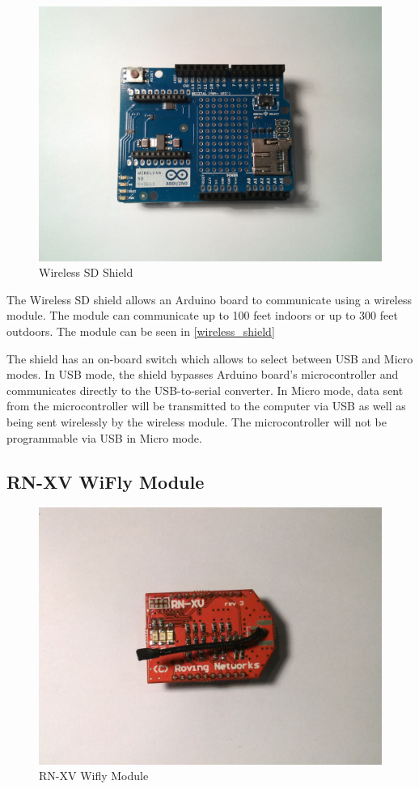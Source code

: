 \begin{figure}[h!]
\centering
\includegraphics[scale=0.58]{2/figures/wireless_shield.pdf}
\caption{Wireless SD Shield}
\label{wireless_shield}
\end{figure}

The Wireless SD shield \cite{arduino_wireless} allows an Arduino board to communicate using a wireless module. The module can communicate up to 100 feet indoors or up to 300 feet outdoors. The module can be seen in \autoref{wireless_shield} 

The shield has an on-board switch which allows to select between USB and Micro modes. In USB mode, the shield bypasses Arduino board's microcontroller and communicates directly to the USB-to-serial converter. In Micro mode, data sent from the microcontroller will be transmitted to the computer via USB as well as being sent wirelessly by the wireless module. The microcontroller will not be programmable via USB in Micro mode.

\subsection{RN-XV WiFly Module}

\begin{figure}[h!]
\centering
\includegraphics[scale=0.58]{2/figures/wifly.pdf}
\caption{RN-XV Wifly Module}
\label{wifly_module}
\end{figure}	

